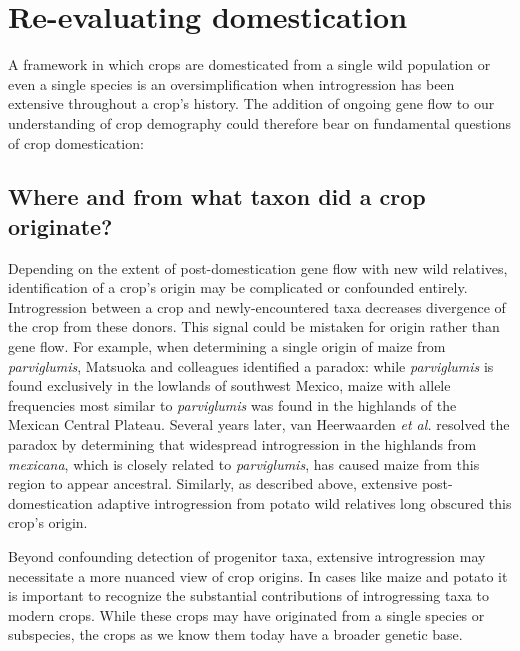 \documentclass[11pt]{article}
\begin{document}
\section*{Re-evaluating domestication}

A framework in which crops are domesticated from a single wild population or even a single species is an oversimplification when introgression has been extensive throughout a crop's history.
The addition of ongoing gene flow to our understanding of crop demography could therefore bear on fundamental questions of crop domestication:

\subsection*{Where and from what taxon did a crop originate?}
Depending on the extent of post-domestication gene flow with new wild relatives, identification of a crop's origin may be complicated or confounded entirely.
Introgression between a crop and newly-encountered taxa decreases divergence of the crop from these donors.
This signal could be mistaken for origin rather than gene flow.
For example, when determining a single origin of maize from \emph{parviglumis}, Matsuoka and colleagues \cite{matsuoka2002single} identified a paradox: while \emph{parviglumis} is found exclusively in the lowlands of southwest Mexico, maize with allele frequencies most similar to \emph{parviglumis} was found in the highlands of the Mexican Central Plateau.
Several years later, van Heerwaarden \emph{et al.} \cite{vanHeerwaarden2011} resolved the paradox by determining that widespread introgression in the highlands from \emph{mexicana}, which is closely related to \emph{parviglumis}, has caused maize from this region to appear ancestral.
Similarly, as described above, extensive post-domestication adaptive introgression from  potato wild relatives long obscured this crop's origin.

Beyond confounding detection of progenitor taxa, extensive introgression may necessitate a more nuanced view of crop origins.
In cases like maize and potato it is important to recognize the substantial contributions of introgressing taxa to modern crops.
While these crops may have originated from a single species or subspecies, the crops as we know them today have a broader genetic base.
\end{document}
